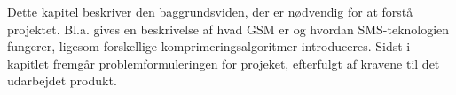 Dette kapitel beskriver den baggrundsviden, der er nødvendig for at forstå projektet. Bl.a. gives en beskrivelse af hvad GSM er og hvordan SMS-teknologien fungerer, ligesom forskellige komprimeringsalgoritmer introduceres. Sidst i kapitlet fremgår problemformuleringen for projeket, efterfulgt af kravene til det udarbejdet produkt.